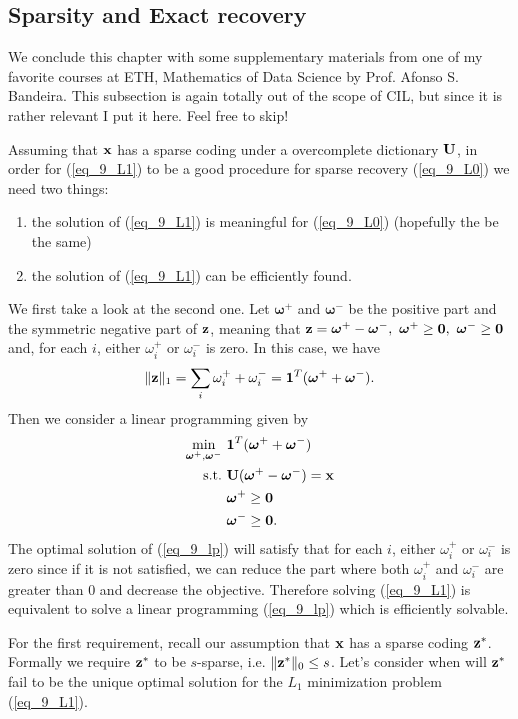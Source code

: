 \documentclass[../book-template.tex]{subfiles}
\begin{document}
\subsection{Sparsity and Exact recovery}\label{sec_9_comp_sens}
We conclude this chapter with some supplementary materials from one of my favorite courses at ETH, Mathematics of Data Science by Prof. Afonso S. Bandeira. This subsection is again totally out of the scope of CIL, but since it is rather relevant I put it here. Feel free to skip!
\par Assuming that ${\bf x}$ has a sparse coding under a overcomplete dictionary ${\bf U}$, in order for (\ref{eq_9_L1}) to be a good procedure for sparse recovery (\ref{eq_9_L0}) we need two things:
\begin{enumerate}
	\item the solution of (\ref{eq_9_L1}) is meaningful for (\ref{eq_9_L0}) (hopefully the be the same)
	\item the solution of (\ref{eq_9_L1}) can be efficiently found.
\end{enumerate}
We first take a look at the second one. Let $\bm{\omega}^+$ and $\bm{\omega}^-$ be the positive part and the symmetric negative part of ${\bf z}$, meaning that ${\bf z}=\bm{\omega}^+ - \bm{\omega}^-,\ \bm{\omega}^+\geq {\bf 0},\ \bm{\omega}^-\geq {\bf 0}$ and, for each $i$, either $\omega_i^+$ or $\omega_i^-$ is zero. In this case, we have
\begin{equation*}
	\|{\bf z}\|_1=\sum_i \omega_i^+ + \omega_i^- = {\bf 1}^T(\bm{\omega}^+ + \bm{\omega}^-).
\end{equation*}
Then we consider a linear programming given by
\begin{align}
	\label{eq_9_lp}\min_{\bm{\omega}^+ , \bm{\omega}^-}\ &{\bf 1}^T(\bm{\omega}^+ + \bm{\omega}^-)\\
	{\rm s.t.}\ &{\bf U}(\bm{\omega}^+ - \bm{\omega}^-) = {\bf x}\notag\\
				& \bm{\omega}^+\geq {\bf 0}\notag\\ 
				&\bm{\omega}^-\geq {\bf 0}.\notag
\end{align}
The optimal solution of (\ref{eq_9_lp}) will satisfy that for each $i$, either $\omega_i^+$ or $\omega_i^-$ is zero since if it is not satisfied, we can reduce the part where both $\omega_i^+$ and $\omega_i^-$ are greater than 0 and decrease the objective. Therefore solving (\ref{eq_9_L1}) is equivalent to solve a linear programming (\ref{eq_9_lp}) which is efficiently solvable. 
\par For the first requirement, recall our assumption that ${\bf x}$ has a sparse coding ${\bf z}^*$. Formally we require ${\bf z}^*$ to be $s$-sparse, i.e. $\|{\bf z}^*\|_0\leq s$. Let's consider when will ${\bf z}^*$ fail to be the unique optimal solution for the $L_1$ minimization problem (\ref{eq_9_L1}).
\end{document}
